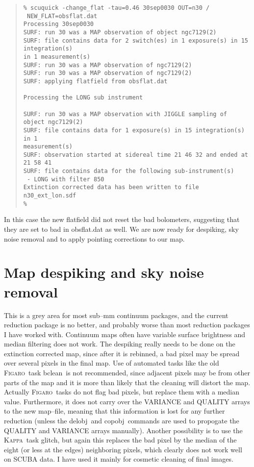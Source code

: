 \documentclass[twoside,11pt]{article}
\newenvironment{myquote}{\begin{quote}\begin{small}}{\end{small}\end{quote}}
\newcommand{\Kappa}{\xref{\textsc{Kappa}}{sun95}{}}
\newcommand{\Figaro}{\xref{\textsc{Figaro}}{sun86}{}}
\newcommand{\task}[1]{\textsf{#1}}
\newcommand{\glitch}{\xref{\task{glitch}}{sun95}{GLITCH}}
\newcommand{\delobj}{\xref{\task{delobj}}{sun86}{DELOBJ}}
\newcommand{\copobj}{\xref{\task{copobj}}{sun86}{COPOBJ}}
\newcommand{\bclean}{\xref{\task{bclean}}{sun86}{BCLEAN}}
\newcommand{\xref}[3]{#1}
\newcommand{\xlabel}[1]{}
\begin{document}
\begin{myquote} \begin{verbatim} 
% scuquick -change_flat -tau=0.46 30sep0030 OUT=n30 / 
 NEW_FLAT=obsflat.dat
Processing 30sep0030
SURF: run 30 was a MAP observation of object ngc7129(2)
SURF: file contains data for 2 switch(es) in 1 exposure(s) in 15 integration(s)
in 1 measurement(s)
SURF: run 30 was a MAP observation of ngc7129(2)
SURF: run 30 was a MAP observation of ngc7129(2)
SURF: applying flatfield from obsflat.dat
 
Processing the LONG sub instrument
 
SURF: run 30 was a MAP observation with JIGGLE sampling of object ngc7129(2)
SURF: file contains data for 1 exposure(s) in 15 integration(s) in 1
measurement(s)
SURF: observation started at sidereal time 21 46 32 and ended at 21 58 41
SURF: file contains data for the following sub-instrument(s)
 - LONG with filter 850
Extinction corrected data has been written to file n30_ext_lon.sdf
% 
\end{verbatim} \end{myquote}

In this case the new flatfield did not reset the bad bolometers,
suggesting that they are set to bad in obsflat.dat as well.  We are now
ready for despiking, sky noise removal and to apply pointing corrections
to our map.

\section{\xlabel{map_despiking_and_sky_noise_removal}Map despiking and sky noise removal}

This is a grey area for most sub--mm continuum packages, and the current
reduction package is no better, and probably worse than most reduction
packages I have worked with. Continuum maps often have variable surface
brightness and median filtering does not work. The despiking really needs to
be done on the extinction corrected map, since after it is rebinned, a bad
pixel may be spread over several pixels in the final map. Use of automated
tasks like the old \Figaro\ task \bclean\ is not recommended, since adjacent
pixels may be from other parts of the map and it is more than likely that the
cleaning will distort the map. Actually \Figaro\ tasks do not flag bad pixels,
but replace them with a median value.  Furthermore, it does not carry over the
VARIANCE and QUALITY arrays to the new map--file, meaning that this
information is lost for any further reduction (unless the \delobj\ and
\copobj\ commands are used to propogate the QUALITY and VARIANCE arrays
manually). Another possibility is to use the \Kappa\ task \glitch, but
again this replaces the bad pixel by the median of the eight (or less at the
edges) neighboring pixels, which clearly does not work well on SCUBA data. I
have used it mainly for cosmetic cleaning of final images.
\end{document}
